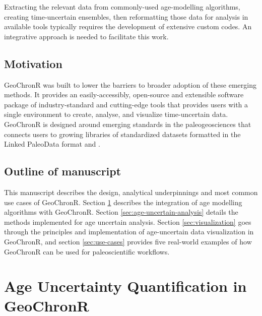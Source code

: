 \documentclass[gc, manuscript]{copernicus}
\begin{document}
Extracting the relevant data from commonly-used age-modelling algorithms, creating time-uncertain ensembles, then reformatting those data for analysis in available tools typically requires the development of extensive custom codes. An integrative approach is needed to facilitate this work.

\subsection{Motivation}

GeoChronR was built to lower the barriers to broader adoption of these emerging methods.
It provides an easily-accessibly, open-source and extensible software package of industry-standard and cutting-edge tools that provides users with a single environment to create, analyse, and visualize time-uncertain data.
GeoChronR is designed around emerging standards in the paleogeosciences that connects users to growing libraries of standardized datasets formatted in the Linked PaleoData format \citep{LiPD} and \citep{neotoma}.

\subsection{Outline of manuscript}

This manuscript describes the design, analytical underpinnings and most common use cases of GeoChronR.
Section \ref{sec:age-modeling} describes the integration of age modelling algorithms with GeoChronR.
Section \ref{sec:age-uncertain-analysis} details the methods implemented for age uncertain analysis.
Section \ref{sec:visualization} goes through the principles and implementation of age-uncertain data visualization in GeoChronR, and section \ref{sec:use-cases} provides five real-world examples of how GeoChronR can be used for paleoscientific workflows.

\hypertarget{sec:age-modeling}{%
\section{Age Uncertainty Quantification in GeoChronR}\label{sec:age-modeling}}
\end{document}
